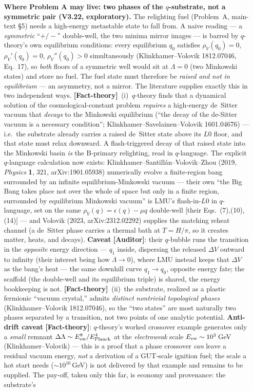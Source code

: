 \documentclass[11pt]{article}
\newcommand{\Auditor}{\textbf{\textcolor{teal!55!black}{[Auditor]}}}
\newcommand{\factth}{\textcolor{green!40!black}{\textbf{[Fact-theory]}}}
\begin{document}
\noindent\textbf{Where Problem A may live: two phases of the $q$-substrate, not a symmetric pair (V3.22, exploratory).} The relighting fuel (Problem~A, main-text \S5) needs a high-energy metastable state to fall from. A naive reading --- a \emph{symmetric} ``$+/-$'' double-well, the two minima mirror images --- is barred by $q$-theory's own equilibrium conditions: every equilibrium $q_0$ satisfies $\rho_V(q_0)=0$, $\rho_V'(q_0)=0$, $\rho_V''(q_0)>0$ simultaneously (Klinkhamer--Volovik 1812.07046, Eq.~17), so \emph{both} floors of a symmetric well would sit at $\Lambda=0$ (two Minkowski states) and store no fuel. The fuel state must therefore be \emph{raised and not in equilibrium} --- an asymmetry, not a mirror. The literature supplies exactly this in two independent ways. \factth\ (i)~$q$-theory finds that a dynamical solution of the cosmological-constant problem \emph{requires} a high-energy de~Sitter vacuum that \emph{decays} to the Minkowski equilibrium (``the decay of the de-Sitter vacuum is a necessary condition''; Klinkhamer--Savelainen--Volovik 1601.04676) --- i.e.\ the substrate already carries a raised de~Sitter state above its $L0$ floor, and that state must relax downward. A flash-triggered decay of that raised state into the Minkowski basin \emph{is} the B-primary relighting, read in $q$-language. The explicit $q$-language calculation now exists: Klinkhamer--Santill\'an--Volovik--Zhou (2019, \emph{Physics} \textbf{1}, 321, arXiv:1901.05938) numerically evolve a finite-region bang surrounded by an infinite equilibrium-Minkowski vacuum --- their own ``the Big Bang takes place not over the whole of space but only in a finite region, surrounded by equilibrium Minkowski vacuum'' is LMU's flash-in-$L0$ in $q$-language, set on the same $\rho_V(q)=\epsilon(q)-\mu q$ double-well [their Eqs.~(7),(10),(14)] --- and Volovik (2023, arXiv:2312.02292) supplies the matching reheat channel (a de~Sitter phase carries a thermal bath at $T=H/\pi$, so it creates matter, heats, and decays). \textbf{Caveat} \Auditor: their $q$-bubble runs the transition in the \emph{opposite} energy direction --- $q_1$ inside, dispersing the released $\Delta V$ outward to infinity (their interest being how $\Lambda\!\to\!0$), where LMU instead keeps that $\Delta V$ as the bang's heat --- the same downhill curve $q_1\!\to\!q_0$, opposite energy fate; the scaffold (the double-well and its equilibrium triple) is shared, the energy bookkeeping is not. \factth\ (ii)~the substrate, realized as a plastic fermionic ``vacuum crystal,'' admits \emph{distinct nontrivial topological phases} (Klinkhamer--Volovik 1812.07046), so the ``two states'' are most naturally two phases separated by a transition, not two points of one analytic potential. \textbf{Anti-drift caveat} \factth: $q$-theory's worked crossover example generates only a \emph{small} remnant $\Delta\Lambda\sim E_{\rm ew}^{8}/E_{\rm Planck}^{4}$ at the \emph{electroweak} scale $E_{\rm ew}\sim10^{3}$\,GeV (Klinkhamer--Volovik) --- this is a proof that a phase crossover \emph{can} leave a residual vacuum energy, \emph{not} a derivation of a GUT-scale ignition fuel; the scale a hot start needs ($\sim10^{16}$\,GeV) is not delivered by that example and remains to be supplied. The pay-off, taken only this far, is economy and provenance: the substrate's 
\end{document}
